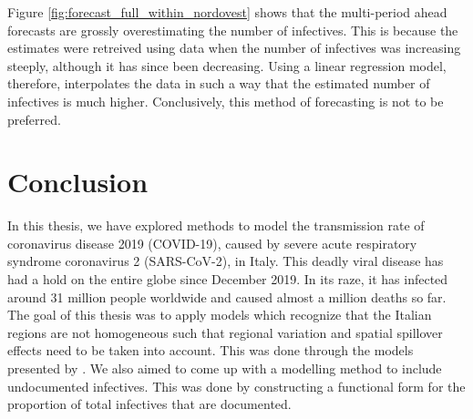 \documentclass[12pt]{article}
\begin{document}
    Figure \ref{fig:forecast_full_within_nordovest} shows that the multi-period ahead forecasts are grossly overestimating the number of infectives. This is because the estimates were retreived using data when the number of infectives was increasing steeply, although it has since been decreasing. Using a linear regression model, therefore, interpolates the data in such a way that the estimated number of infectives is much higher. Conclusively, this method of forecasting is not to be preferred.

	\section{Conclusion} \label{sec:conclusion}
	
	In this thesis, we have explored methods to model the transmission rate of coronavirus disease 2019 (COVID-19), caused by severe acute respiratory syndrome coronavirus 2 (SARS-CoV-2), in Italy. This deadly viral disease has had a hold on the entire globe since December 2019. In its raze, it has infected around 31 million people worldwide and caused almost a million deaths so far. The goal of this thesis was to apply models which recognize that the Italian regions are not homogeneous such that regional variation and spatial spillover effects need to be taken into account. This was done through the models presented by \textcite{adda2016economic}. We also aimed to come up with a modelling method to include undocumented infectives. This was done by constructing a functional form for the proportion of total infectives that are documented. \\
	
\end{document}

